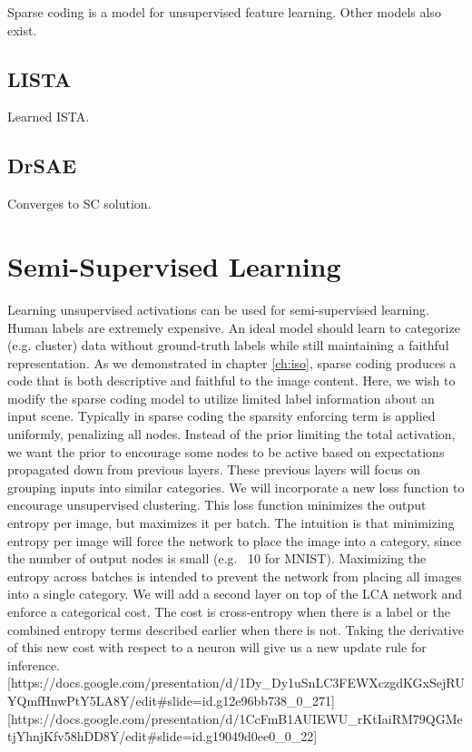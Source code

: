 Sparse coding is a model for unsupervised feature learning. Other models also exist.

\subsection{LISTA}
Learned ISTA.

\subsection{DrSAE}
Converges to SC solution.

\section{Semi-Supervised Learning}
Learning unsupervised activations can be used for semi-supervised learning. Human labels are extremely expensive. An ideal model should learn to categorize (e.g. cluster) data without ground-truth labels while still maintaining a faithful representation. As we demonstrated in chapter \ref{ch:iso}, sparse coding produces a code that is both descriptive and faithful to the image content. Here, we wish to modify the sparse coding model to utilize limited label information about an input scene. Typically in sparse coding the sparsity enforcing term is applied uniformly, penalizing all nodes. Instead of the prior limiting the total activation, we want the prior to encourage some nodes to be active based on expectations propagated down from previous layers. These previous layers will focus on grouping inputs into similar categories. We will incorporate a new loss function to encourage unsupervised clustering. This loss function minimizes the output entropy per image, but maximizes it per batch. The intuition is that minimizing entropy per image will force the network to place the image into a category, since the number of output nodes is small (e.g. ~10 for MNIST). Maximizing the entropy across batches is intended to prevent the network from placing all images into a single category. We will add a second layer on top of the LCA network and enforce a categorical cost. The cost is cross-entropy when there is a label or the combined entropy terms described earlier when there is not. Taking the derivative of this new cost with respect to a neuron will give us a new update rule for inference.
[https://docs.google.com/presentation/d/1Dy_Dy1uSnLC3FEWXczgdKGxSejRUYQmfHnwPtY5LA8Y/edit#slide=id.g12e96bb738_0_271]
[https://docs.google.com/presentation/d/1CcFmB1AUIEWU_rKtIaiRM79QGMetjYhnjKfv58hDD8Y/edit#slide=id.g19049d0ee0_0_22]